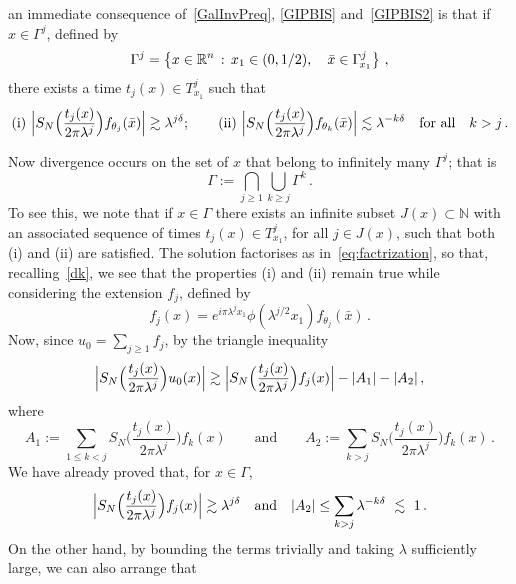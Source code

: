 \documentclass[biblatex]{pzorin-note}
\begin{document}
an immediate consequence of~\eqref{GalInvPreq}, \eqref{GIPBIS} and~\eqref{GIPBIS2} is that if~$x \in \Gamma^j$, defined by
\begin{equation*}
\Gamma^j=\left\{x\in\R^n \, : \, x_1\in(0,1/2),\quad \bar{x}\in\Gamma^{j}_{\!x_1}\right\} \, ,
\end{equation*}
there exists a time $t_{j}(x) \in T^{j}_{x_1}$ such that
\begin{equation}\nonumber
\mbox{(i)} \
\abs[\Big]{ S_{N} \Big( \frac{t_{j}(x)}{2\pi \lambda^{j}} \Big) f_{\theta_{j}}(\bar{x}) } \gtrsim \lambda^{j \delta };
\qquad
\mbox{(ii)} \
\abs[\Big]{ S_{N} \Big( \frac{t_{j}(x)}{2\pi \lambda^{j}} \Big) f_{\theta_{k}}(\bar{x}) }
\lesssim \lambda^{-k \delta}
\quad
\mbox{for all}
\quad
k > j \, .
\end{equation}


Now divergence occurs on the set of $x$ that belong to infinitely many $\Gamma^{j}$; that is \begin{equation*}
\Gamma := \bigcap_{j\ge1} \bigcup_{k\ge j} \Gamma^{k} \, .
\end{equation*}
To see this, we note that if $x \in \Gamma$ there exists an infinite subset $J(x)\subset\mathbb{N}$ with an associated
sequence of times
$t_{j}(x) \in T^{j}_{x_1}$, for all $j\in J(x)$, such that both (i) and (ii) are satisfied.
The solution factorises as in~\eqref{eq:factrization}, so that, recalling~\eqref{dk},
we see that the properties (i) and (ii) remain true while considering the extension $f_j$, defined by
\[
f_j(x)=e^{i\pi \lambda^jx_1}\phi(\lambda^{j/2}x_1)f_{\theta_{j}}(\bar{x}) \, .
\]
Now, since $u_0=\sum_{j\ge 1} f_j$, by the triangle inequality
\begin{equation}\nonumber
\abs[\Big]{ S_{N} \Big( \frac{t_{j}(x)}{2\pi \lambda^{j}} \Big) u_0(x) }
\gtrsim \abs[\Big]{ S_{N} \Big(\frac{t_{j}(x)}{2\pi \lambda^{j}} \Big) f_j(x)} - \abs{ A_1 } - \abs{ A_2 } \, ,
\end{equation}
where
\begin{equation}\nonumber
A_1 \! := \! \sum_{1 \leq k < j} S_{N} \Big( \frac{t_{j}(x)}{2\pi \lambda^{j}} \Big) f_k(x)
\qquad \text{and}\qquad
A_2 \! := \! \sum_{k > j} S_{N} \Big( \frac{t_{j}(x)}{2\pi \lambda^{j}} \Big) f_k(x) \, .
\end{equation}
We have already proved that, for $x \in \Gamma$,
\[
\abs[\Big]{ S_{N} \Big(\frac{t_{j}(x)}{2\pi \lambda^{j}} \Big) f_j(x) } \gtrsim \lambda^{j \delta }\quad \text{and}\quad
\abs{ A_2 } \leq \sum_{k > j} \lambda^{- k \delta} \ \lesssim \ 1\, .
\]
On the other hand, by bounding the terms trivially and taking $\lambda$ sufficiently large, we can also arrange that
\end{document}

